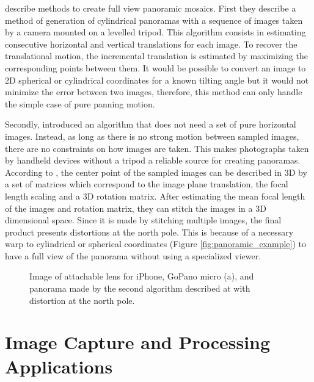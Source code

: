 \citeauthor{szeliski1997creating} \cite{szeliski1997creating} describe methods to create full view panoramic mosaics. First they describe a method of generation of cylindrical panoramas with a sequence of images taken by a camera mounted on a levelled tripod. This algorithm consists in estimating consecutive horizontal and vertical translations for each image. To recover the translational motion, the incremental translation is estimated by maximizing the corresponding points between them. It would be possible to convert an image to 2D spherical or cylindrical coordinates for a known tilting angle but it would not minimize the error between two images, therefore, this method can only handle the simple case of pure panning motion.

Secondly, \citeauthor{szeliski1997creating} \cite{szeliski1997creating} introduced an algorithm that does not need a set of pure horizontal images. Instead, as long as there is no strong motion between sampled images, there are no constraints on how images are taken. This makes photographs taken by handheld devices without a tripod a reliable source for creating panoramas. According to \citeauthor{szeliski1997creating}, the center point of the sampled images can be described in 3D by a set of matrices which correspond to the image plane translation, the focal length scaling and a 3D rotation matrix. After estimating the mean focal length of the images and rotation matrix, they can stitch the images in a 3D dimensional space.
Since it is made by stitching multiple images, the final product presents distortions at the north pole. This is because of a necessary warp to cylindrical or spherical coordinates (Figure \ref{fig:panoramic_example}) to have a full view of the panorama without using a specialized viewer.

\begin{figure}[htbp]
        \centering
  \caption{Image of attachable lens for iPhone, GoPano micro (a), and panorama made by the second algorithm described at \citeauthor{szeliski1997creating} \cite{szeliski1997creating} with distortion at the north pole.}
  \label{fig:panoramic_image}
\end{figure}


\section{Image Capture and Processing Applications}
\label{sub:capturing_processing}

